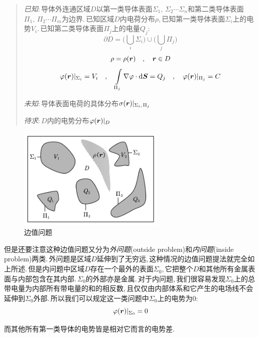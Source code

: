 \begin{verse}
\emph{已知}:\,导体外连通区域$D$以第一类导体表面$\Sigma_1,\,\Sigma_2\cdots\Sigma_n$和第二类导体表面$\Pi_1,\,\Pi_2\cdots\Pi_m$为边界.\,已知区域$D$内电荷分布$\rho$,\,已知第一类导体表面$\Sigma_i$上的电势$V_i$.\,已知第二类导体表面$\Pi_j$上的电量$Q_j$:
\[\partial D=\biggl(\bigcup_i \Sigma_i\biggr)\cup \biggl(\bigcup_j\Pi_j  \biggr) \]
\[\rho=\rho(\boldsymbol{r}) \quad,\quad \boldsymbol{r}\in D\]
\[\varphi(\boldsymbol{r})|_{\Sigma_i}=V_i \quad, \quad \int\limits_{\Pi_j}\nabla\varphi\cdot \textrm{d} \boldsymbol{S}=Q_j \quad, \quad \varphi(\boldsymbol{r})|_{\Pi_j}=C\]

\emph{未知}:\,导体表面电荷的具体分布$\sigma(\boldsymbol{r})|_{\Sigma_i,\,\Pi_j}$

\emph{待求}:\,$D$内的电势分布$\varphi(\boldsymbol{r})|_{D}$

\end{verse}


\begin{figure}
\vspace{-0.2cm}
\centering
\includegraphics[width=7cm]{image/7-2-4.png}
\caption{边值问题}
\end{figure}
但是还要注意这种边值问题又分为\emph{外问题}(outside problem)和\emph{内问题}(inside problem)两类.\,外问题是区域$D$延伸到了无穷远,\,这种情况的边值问题提法就完全如上所述.\,但是内问题中区域$D$存在一个最外的表面$\Sigma_0$,\,它把整个$D$和其他所有金属表面与内部包含在其内部.\,$\Sigma_0$的外部亦是金属.\,对于内问题,\,我们很容易发现$\Sigma_0$上的总带电量为内部所有带电量的和的相反数,\,且仅仅由内部体系和它产生的电场线不会延伸到$\Sigma_0$外部.\,所以我们可以规定这一类问题中$\Sigma_0$上的电势为$0$:
\[\varphi(\boldsymbol{r})|_{\Sigma_0}=0\]

而其他所有第一类导体的电势皆是相对它而言的电势差.

